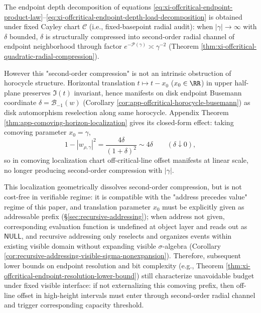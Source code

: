 \begin{remark}\label{rem:xi-comoving-horizon-localization-address-null}
The endpoint depth decomposition of equations \eqref{eq:xi-offcritical-endpoint-product-law}--\eqref{eq:xi-offcritical-endpoint-depth-load-decomposition} is obtained under fixed Cayley chart \(\mathcal{C}\) (i.e., fixed-basepoint radial audit): when \(|\gamma|\to\infty\) with \(\delta\) bounded, \(\delta\) is structurally compressed into second-order radial channel of endpoint neighborhood through factor \(e^{-\mathcal{P}(\gamma)}\asymp \gamma^{-2}\) (Theorem \ref{thm:xi-offcritical-quadratic-radial-compression}).
\par
However this "second-order compression" is not an intrinsic obstruction of horocycle structure.
Horizontal translation \(t\mapsto t-x_0\) (\(x_0\in\RR\)) in upper half-plane preserves \(\Im(t)\) invariant, hence manifests on disk endpoint Busemann coordinate \(\delta=\mathcal{B}_{-1}(w)\) (Corollary \ref{cor:app-offcritical-horocycle-busemann}) as disk automorphism reselection along same horocycle.
Appendix Theorem \ref{thm:app-comoving-horizon-localization} gives its closed-form effect: taking comoving parameter \(x_0=\gamma\),
\[
1-|w_{\rho,\gamma}|^2=\frac{4\delta}{(1+\delta)^2}\sim 4\delta\qquad(\delta\downarrow 0),
\]
so in comoving localization chart off-critical-line offset manifests at linear scale, no longer producing second-order compression with \(|\gamma|\).
\par
This localization geometrically dissolves second-order compression, but is not cost-free in verifiable regime: it is compatible with the "address precedes value" regime of this paper, and translation parameter \(x_0\) must be explicitly given as addressable prefix (\S\ref{sec:recursive-addressing}); when address not given, corresponding evaluation function is undefined at object layer and reads out as \(\mathsf{NULL}\), and recursive addressing only reselects and organizes events within existing visible domain without expanding visible \(\sigma\)-algebra (Corollary \ref{cor:recursive-addressing-visible-sigma-nonexpansion}).
Therefore, subsequent lower bounds on endpoint resolution and bit complexity (e.g., Theorem \ref{thm:xi-offcritical-endpoint-resolution-lower-bound}) still characterize unavoidable budget under fixed visible interface: if not externalizing this comoving prefix, then off-line offset in high-height intervals must enter through second-order radial channel and trigger corresponding capacity threshold.
\end{remark}

